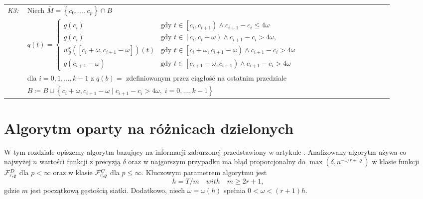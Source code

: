 \documentclass[oik, pdftex, robocza, man]{mgrwms}
\begin{document}
\begin{tabular}{p{0.045\linewidth} p{0.85\linewidth}}
        \textit{K3:}    & Niech $\bar{M} = \left\{ c_{0}, \dots, c_{p} \right\} \cap B$ \\
                        & $q(t)= \begin{cases}
                            g\left(c_{i}\right)                                                 &\text{gdy } t \in \left[c_{i}, c_{i+1}\right) \land c_{i+1}-c_{i} \leq 4 \omega \\ 
                            g\left(c_{i}\right)                                                 &\text{gdy } t \in \left[c_{i}, c_{i}+\omega\right) \land c_{i+1}-c_{i}>4 \omega, \\ 
                            w_{g}^{r}\left(\left[c_{i}+\omega, c_{i+1}-\omega\right]\right)(t)  &\text{gdy } t \in\left[c_{i}+\omega, c_{i+1}-\omega\right) \land c_{i+1}-c_{i}>4 \omega \\ 
                            g\left(c_{i+1}-\omega\right)                                        &\text{gdy } t \in\left[c_{i+1}-\omega, c_{i+1}\right) \land c_{i+1}-c_{i}>4 \omega
                            \end{cases}$ \vspace{3pt} \\
                        & dla $i=0,1,\dots,k-1$ z $q(b) = $ zdefiniowanym przez ciągłość na ostatnim przedziale \\
                        & $B \coloneqq B \cup \left\{ c_{i} + \omega, c_{i+1} - \omega \mid c_{i+1} - c_{i} > 4\omega,\; i=0,\dots,k-1 \right\}$ \\

    \end{tabular} \vspace{10pt}


\section{Algorytm oparty na różnicach dzielonych}


    W tym rozdziale opiszemy algorytm bazujący na informacji zaburzonej przedstawiony w artykule \cite{AoP}. Analizowany algorytm używa co najwyżej $n$ wartości funkcji z precyzją $\delta $ oraz w najgorszym przypadku ma błąd proporcjonalny do $\max{(\delta, n^{-1 / r + \varrho })}$ w klasie funkcji $\mathcal{F}^D_{r,\varrho }$ dla $p < \infty$ oraz w klasie $\mathcal{F}^C_{r,\varrho }$ dla $p \leq \infty$. Kluczowym parametrem algorytmu jest
    $$
        h = T / m \quad with \quad  m \geq 2r + 1,
    $$
    gdzie $m$ jest początkową gęstością siatki. Dodatkowo, niech $\omega  = \omega(h)$ spełnia $0 < \omega < (r + 1)h $.
\end{document}
